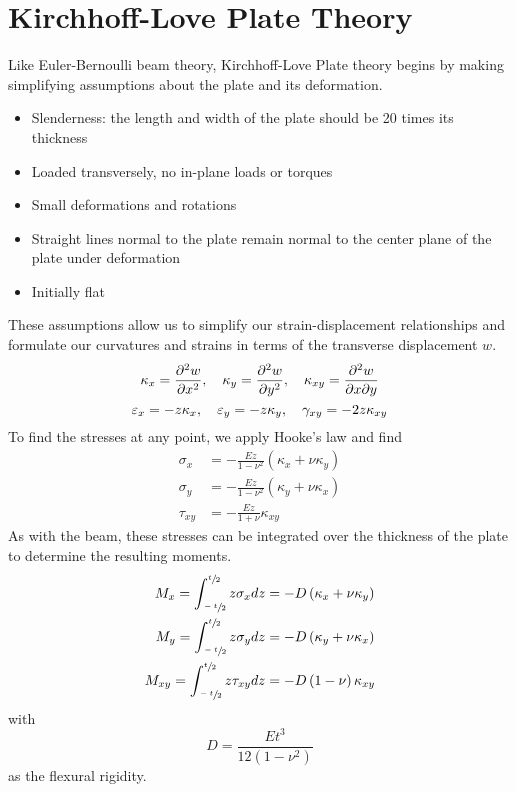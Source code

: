 \section{Kirchhoff-Love Plate Theory}
Like Euler-Bernoulli beam theory, Kirchhoff-Love Plate theory begins by making simplifying assumptions about the plate and its deformation.
\begin{itemize}
 \item Slenderness: the length and width of the plate should be 20 times its thickness
 \item Loaded transversely, no in-plane loads or torques
 \item Small deformations and rotations
 \item Straight lines normal to the plate remain normal to the center plane of the plate under deformation
 \item Initially flat
\end{itemize}
These assumptions allow us to simplify our strain-displacement relationships and formulate our curvatures and strains in terms of the transverse displacement $w$.
\begin{equation}
    \kappa_x=\frac{\partial^2 w}{\partial x^2}, \quad \kappa_y= \frac{\partial^2 w}{\partial y^2}, \quad \kappa_{xy}=\frac{\partial^2 w}{\partial x\partial y}\notag
\end{equation}
\begin{equation}
\varepsilon_x = -z \kappa_x, \quad \varepsilon_y = -z \kappa_y, \quad \gamma_{xy} = -2 z \kappa_{xy} \notag
\end{equation}
To find the stresses at any point, we apply Hooke's law and find
\begin{align*}
\sigma_x &= -\frac{E z}{1-\nu^2}\left(\kappa_x+\nu\kappa_y\right)\\
\sigma_y &= -\frac{E z}{1-\nu^2}\left(\kappa_y+\nu\kappa_x\right)\\
\tau_{xy} &= -\frac{Ez}{1+\nu}\kappa_{xy}
\end{align*}
As with the beam, these stresses can be integrated over the thickness of the plate to determine the resulting moments.
\begin{align*}
M_x = \int_{\sfrac{-t}{2}}^{\sfrac{t}{2}}z\sigma_x dz &=-D\left(\kappa_x+\nu\kappa_y\right)\\
M_y = \int_{\sfrac{-t}{2}}^{\sfrac{t}{2}}z\sigma_y dz &=-D\left(\kappa_y+\nu\kappa_x\right)\\
M_{xy} = \int_{\sfrac{-t}{2}}^{\sfrac{t}{2}}z\tau_{xy}dz &= -D\left(1-\nu\right)\kappa_{xy}
\end{align*}
with
\begin{equation*}
D=\frac{Et^3}{12\left(1-\nu^2\right)}
\end{equation*}
as the flexural rigidity.

